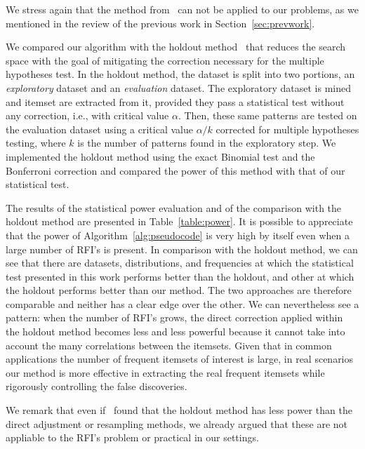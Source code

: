 We stress again that the method
from~\citep{Hanhijarvi11} can not be applied to our problems, as we
mentioned in the review of the previous work in
Section~\ref{sec:prevwork}. 

We compared our algorithm with the holdout method~\citep{Webb07} that reduces the search space
with the goal of mitigating the correction necessary for the multiple hypotheses test.
In the holdout
method, the dataset is split into two portions, an \emph{exploratory} dataset
and an \emph{evaluation} dataset. The exploratory dataset is mined and itemset
are extracted from it, provided they pass a statistical test without any
correction, i.e., with critical value $\alpha$. Then, these same patterns are
tested on the evaluation dataset using a critical value $\alpha/k$ corrected for
multiple hypotheses testing, where $k$ is the number of patterns found in the
exploratory step. We implemented the holdout method using the exact Binomial
test and the Bonferroni correction and compared the power of this method with
that of our statistical test. 

The results of the statistical power evaluation and of the comparison with the
holdout method are presented in Table~\ref{table:power}. It is possible to
appreciate that the power of Algorithm~\ref{alg:pseudocode} is very high by
itself even when a large number of RFI's is present. In comparison with the
holdout method, we can see that there are datasets, distributions, and
frequencies at which the statistical test presented in this work performs better
than the holdout, and other at which the holdout performs better than our method. The two
approaches are therefore comparable and neither has a clear edge over the other.
We can nevertheless see a pattern: when the number of RFI's grows, the direct
correction applied within the holdout method becomes less and less powerful
because it cannot take into account the many correlations between the itemsets.
Given that in common applications the number of frequent itemsets of interest is
large, in real scenarios our method is more effective in extracting the real
frequent itemsets while rigorously controlling the false discoveries.

We remark that even if~\citet{LiuZW11} found that the holdout method
has less power than the direct adjustment or resampling methods, we already
argued that these are not appliable to the RFI's problem or practical in our settings.

